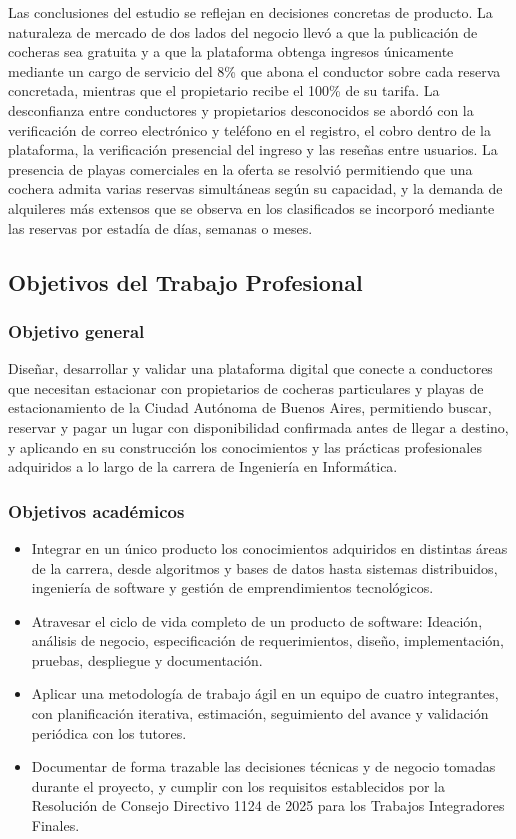 Las conclusiones del estudio se reflejan en decisiones concretas de producto. La naturaleza de mercado de dos lados del negocio llevó a que la publicación de cocheras sea gratuita y a que la plataforma obtenga ingresos únicamente mediante un cargo de servicio del 8\% que abona el conductor sobre cada reserva concretada, mientras que el propietario recibe el 100\% de su tarifa. La desconfianza entre conductores y propietarios desconocidos se abordó con la verificación de correo electrónico y teléfono en el registro, el cobro dentro de la plataforma, la verificación presencial del ingreso y las reseñas entre usuarios. La presencia de playas comerciales en la oferta se resolvió permitiendo que una cochera admita varias reservas simultáneas según su capacidad, y la demanda de alquileres más extensos que se observa en los clasificados se incorporó mediante las reservas por estadía de días, semanas o meses.

\subsection{Objetivos del Trabajo Profesional}

\subsubsection{Objetivo general}

Diseñar, desarrollar y validar una plataforma digital que conecte a conductores que necesitan estacionar con propietarios de cocheras particulares y playas de estacionamiento de la Ciudad Autónoma de Buenos Aires, permitiendo buscar, reservar y pagar un lugar con disponibilidad confirmada antes de llegar a destino, y aplicando en su construcción los conocimientos y las prácticas profesionales adquiridos a lo largo de la carrera de Ingeniería en Informática.

\subsubsection{Objetivos académicos}

\begin{itemize}
    \item Integrar en un único producto los conocimientos adquiridos en distintas áreas de la carrera, desde algoritmos y bases de datos hasta sistemas distribuidos, ingeniería de software y gestión de emprendimientos tecnológicos.
    \item Atravesar el ciclo de vida completo de un producto de software: Ideación, análisis de negocio, especificación de requerimientos, diseño, implementación, pruebas, despliegue y documentación.
    \item Aplicar una metodología de trabajo ágil en un equipo de cuatro integrantes, con planificación iterativa, estimación, seguimiento del avance y validación periódica con los tutores.
    \item Documentar de forma trazable las decisiones técnicas y de negocio tomadas durante el proyecto, y cumplir con los requisitos establecidos por la Resolución de Consejo Directivo 1124 de 2025 para los Trabajos Integradores Finales.
\end{itemize}

